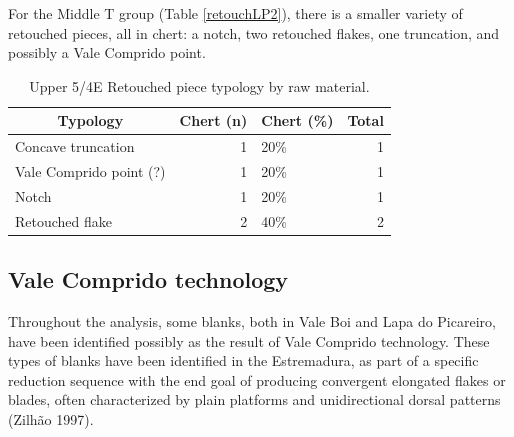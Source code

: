 \documentclass[12pt,twoside]{reedthesis}
\begin{document}
For the Middle T group (Table \ref{retouchLP2}), there is a smaller variety of retouched pieces, all in chert: a notch, two retouched flakes, one truncation, and possibly a Vale Comprido point.
\begin{table}

\caption{\label{tab:retouchLP1}U/Lower T retouched piece typology by raw material.}
\centering
{}
\end{table}
\begin{table}

\caption{\label{tab:retouchLP2}Upper 5/4E Retouched piece typology by raw material.}
\centering
\begin{tabular}[t]{lrlr}
\toprule
\multicolumn{1}{c}{\textbf{Typology}} & \multicolumn{1}{c}{\textbf{Chert (n)}} & \multicolumn{1}{c}{\textbf{Chert (\%)}} & \multicolumn{1}{c}{\textbf{Total}}\\
\midrule
Concave truncation & 1 & 20\% & 1\\
Vale Comprido point (?) & 1 & 20\% & 1\\
Notch & 1 & 20\% & 1\\
Retouched flake & 2 & 40\% & 2\\
\bottomrule
\end{tabular}
\end{table}
\hypertarget{vale-comprido-technology}{%
\subsection{Vale Comprido technology}\label{vale-comprido-technology}}

Throughout the analysis, some blanks, both in Vale Boi and Lapa do Picareiro, have been identified possibly as the result of Vale Comprido technology. These types of blanks have been identified in the Estremadura, as part of a specific reduction sequence with the end goal of producing convergent elongated flakes or blades, often characterized by plain platforms and unidirectional dorsal patterns (Zilhão 1997).
\end{document}
